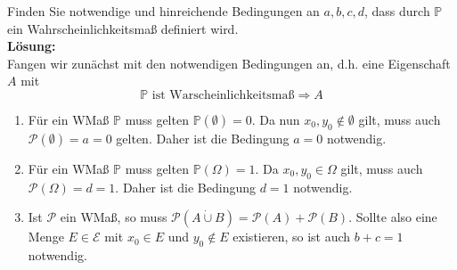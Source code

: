 \documentclass[11pt,a4paper,ngerman]{article}
\begin{document}
Finden Sie notwendige und hinreichende Bedingungen an $a,b,c,d$, dass durch $\mathbb{P}$ ein Wahrscheinlichkeitsmaß definiert wird.\\

\textbf{Lösung:}\\

Fangen wir zunächst mit den notwendigen Bedingungen an, d.h.
eine Eigenschaft $A$ mit
\[
    \mathbb{P}\text{ ist Warscheinlichkeitsmaß} \Rightarrow A
\]

\begin{enumerate}[1.]
    \item Für ein WMaß $\mathbb{P}$ muss gelten $\mathbb{P}(\emptyset) = 0$. Da nun $x_0, y_0 \not\in \emptyset$ gilt, muss auch
            $\mathcal{P}(\emptyset) = a = 0$ gelten. Daher ist die Bedingung $a = 0$ notwendig.
    \item Für ein WMaß $\mathbb{P}$ muss gelten $\mathbb{P}(\Omega) = 1$. Da $x_0, y_0 \in \Omega$ gilt, muss auch
            $\mathcal{P}(\Omega) = d = 1$. Daher ist die Bedingung $d = 1$ notwendig.
    \item Ist $\mathcal{P}$ ein WMaß, so muss $\mathcal{P}(A \dot\cup B) = \mathcal{P}(A) + \mathcal{P}(B)$. Sollte also
        eine Menge $E\in\mathcal{E}$ mit $x_0 \in E$ und $y_0 \not\in E$ existieren, so ist auch
            $b + c = 1$ notwendig. 
\end{enumerate}
\end{document}
